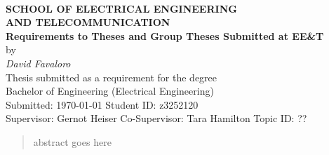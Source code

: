 \begin{center}
\\[0.5cm]
\textbf{\large SCHOOL OF ELECTRICAL ENGINEERING\\
AND TELECOMMUNICATION}\\[2cm]
{\addtolength{\baselineskip}{0.5cm}
\textbf{\Huge
Requirements to Theses and Group Theses Submitted at EE\&T} \\[0.5cm]
}
{\Large by}\\[0.5cm]
\textit{\huge
David Favaloro} \\[1.5cm]
{\Large
Thesis submitted as a requirement for the degree\\
Bachelor of Engineering (Electrical Engineering)\\[2ex]
\vfill
Submitted: \today\hfill
Student ID: z3252120\\[-1.5ex]
Supervisor: Gernot Heiser\hfill
Co-Supervisor: Tara Hamilton
Topic ID: ??\\
\vspace*{-1cm}
}
\end{center}

\begin{abstract}
abstract goes here
\end{abstract}
